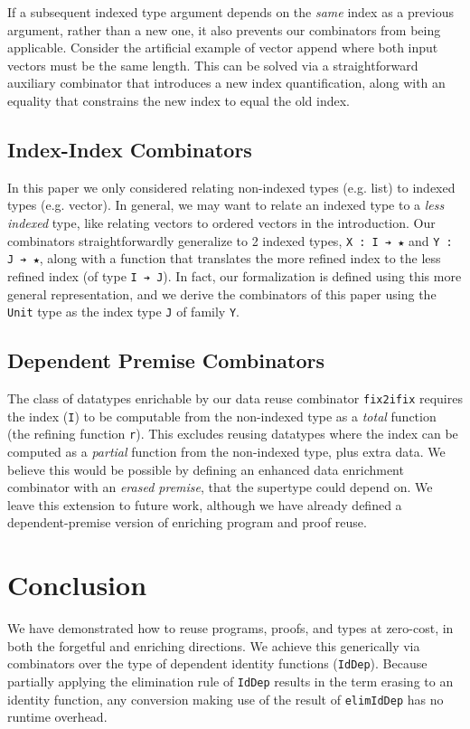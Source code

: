 \documentclass[acmsmall]{acmart}\settopmatter{}
\newcommand{\labsec}[1]{\label{sec:#1}}
\begin{document}
If a subsequent indexed type argument depends on the \textit{same}
index as a previous argument, rather than a new one, it also prevents
our combinators from being applicable. Consider the
artificial example of vector append where both input vectors must be
the same length. This can be solved via a
straightforward auxiliary combinator that introduces a new index quantification,
along with an equality that constrains the new index to equal the old index.

\subsection{Index-Index Combinators}

In this paper we only considered relating non-indexed types (e.g. list)
to indexed types (e.g. vector). In general, we may want to relate
an indexed type to a \textit{less indexed} type, like relating vectors
to ordered vectors in the introduction. Our combinators
straightforwardly generalize to 2 indexed types, \verb;X : I ➔ ★; and
\verb;Y : J ➔ ★;, along with a function that translates
the more refined index to the less refined index
(of type \verb;I ➔ J;). In fact, our formalization is defined using this
more general representation, and we derive the combinators of this
paper using the \verb;Unit; type as the index type \verb;J; of family \verb;Y;.

\subsection{Dependent Premise Combinators}

The class of datatypes enrichable by our data reuse combinator \verb;fix2ifix;
requires the index (\verb;I;) to be computable from the non-indexed
type as a \textit{total} function (the refining function
\verb;r;). This excludes reusing datatypes where the index can be
computed as a \textit{partial} function from the non-indexed type,
plus extra data. We believe this would be possible by defining an
enhanced data enrichment combinator with an \textit{erased premise}, that
the supertype could depend on. We leave this extension to future work,
although we have already defined a dependent-premise version of
enriching program and proof reuse.

\section{Conclusion}

We have demonstrated how to reuse programs, proofs, and types at
zero-cost, in both the forgetful and enriching directions. We achieve
this generically via combinators over the type of dependent identity
functions (\verb;IdDep;). Because partially applying the elimination
rule of \verb;IdDep; results in the term erasing to an identity
function, any conversion making use of the result of \verb;elimIdDep;
has no runtime overhead.

\labsec{conc}





\end{document}
